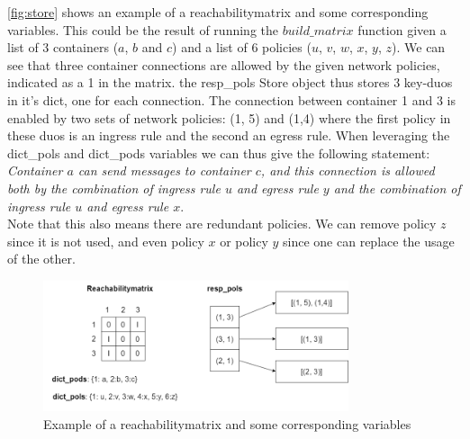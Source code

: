 \autoref{fig:store} shows an example of a reachabilitymatrix and some corresponding variables. This could be the result of running the  $build\_matrix$ function given a list of 3 containers ($a$, $b$ and $c$) and a list of 6 policies ($u$, $v$, $w$, $x$, $ y$, $z$). We can see that three container connections are allowed by the given network policies, indicated as a 1 in the matrix. the resp\_pols Store object thus stores 3 key-duos in it's dict, one for each connection. The connection between container 1 and 3 is enabled by two sets of network policies: (1, 5) and (1,4) where the first policy in these duos is an ingress rule and the second an egress rule. When leveraging the dict\_pols and dict\_pods variables we can thus give the following statement:
\\[10pt] 
\textit{Container $a$ can send messages to container $c$, and this connection is allowed both by the combination of ingress rule $u$ and egress rule $y$ and the combination of ingress rule $u$ and egress rule $x$}.
\\[10pt]
Note that this also means there are redundant policies. We can remove policy $z$ since it is not used, and even policy $x$ or policy $y$ since one can replace the usage of the other.
\begin{figure}[H]
  \centering
  \includegraphics[width=0.8\textwidth]{images/store.png}
  \caption{Example of a reachabilitymatrix and some corresponding variables}
  \label{fig:store}
\end{figure}


